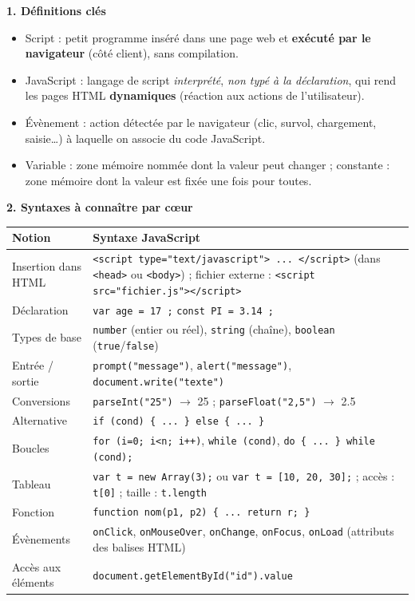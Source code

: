 \documentclass[11pt]{article}
\newcommand{\cle}[1]{{\popxbold\color{popdark}#1}}
\begin{document}
\begin{bilan}
\textbf{1. Définitions clés}
\begin{itemize}
  \item \cle{Script} : petit programme inséré dans une page web et \textbf{exécuté par le navigateur} (côté client), sans compilation.
  \item \cle{JavaScript} : langage de script \emph{interprété}, \emph{non typé à la déclaration}, qui rend les pages HTML \textbf{dynamiques} (réaction aux actions de l'utilisateur).
  \item \cle{Évènement} : action détectée par le navigateur (clic, survol, chargement, saisie\ldots) à laquelle on associe du code JavaScript.
  \item \cle{Variable} : zone mémoire nommée dont la valeur peut changer ; \cle{constante} : zone mémoire dont la valeur est fixée une fois pour toutes.
\end{itemize}

\textbf{2. Syntaxes à connaître par c\oe ur}
\begin{center}
\begin{tabularx}{\linewidth}{|l|X|}
\hline
\rowcolor{popblueL} \textbf{Notion} & \textbf{Syntaxe JavaScript} \\
\hline
Insertion dans HTML & \texttt{<script type="text/javascript"> ... </script>} (dans \texttt{<head>} ou \texttt{<body>}) ; fichier externe : \texttt{<script src="fichier.js"></script>} \\
\hline
Déclaration & \texttt{var age = 17 ;} \quad \texttt{const PI = 3.14 ;} \\
\hline
Types de base & \texttt{number} (entier ou réel), \texttt{string} (chaîne), \texttt{boolean} (\texttt{true}/\texttt{false}) \\
\hline
Entrée / sortie & \texttt{prompt("message")}, \texttt{alert("message")}, \texttt{document.write("texte")} \\
\hline
Conversions & \texttt{parseInt("25")} $\to$ 25 ; \texttt{parseFloat("2,5")} $\to$ 2.5 \\
\hline
Alternative & \texttt{if (cond) \{ ... \} else \{ ... \}} \\
\hline
Boucles & \texttt{for (i=0; i<n; i++)}, \texttt{while (cond)}, \texttt{do \{ ... \} while (cond);} \\
\hline
Tableau & \texttt{var t = new Array(3);} ou \texttt{var t = [10, 20, 30];} ; accès : \texttt{t[0]} ; taille : \texttt{t.length} \\
\hline
Fonction & \texttt{function nom(p1, p2) \{ ... return r; \}} \\
\hline
Évènements & \texttt{onClick}, \texttt{onMouseOver}, \texttt{onChange}, \texttt{onFocus}, \texttt{onLoad} (attributs des balises HTML) \\
\hline
Accès aux éléments & \texttt{document.getElementById("id").value} \\
\hline
\end{tabularx}
\end{center}


\end{bilan}
\end{document}
